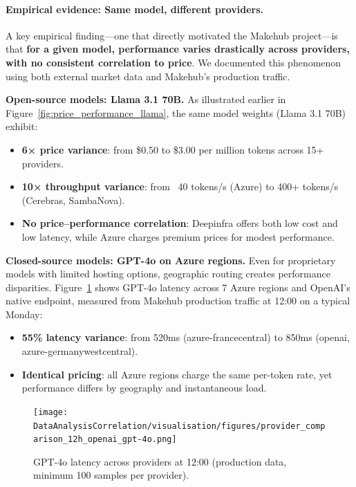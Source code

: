\documentclass[english]{article}
\begin{document}
\paragraph{Empirical evidence: Same model, different providers.}

A key empirical finding—one that directly motivated the Makehub project—is that \textbf{for a given model, performance varies drastically across providers, with no consistent correlation to price}. We documented this phenomenon using both external market data and Makehub's production traffic.

\textbf{Open-source models: Llama 3.1 70B.} As illustrated earlier in Figure~\ref{fig:price_performance_llama}, the same model weights (Llama 3.1 70B) exhibit:
\begin{itemize}
    \item \textbf{6× price variance}: from \$0.50 to \$3.00 per million tokens across 15+ providers.
    \item \textbf{10× throughput variance}: from ~40 tokens/s (Azure) to 400+ tokens/s (Cerebras, SambaNova).
    \item \textbf{No price–performance correlation}: Deepinfra offers both low cost and low latency, while Azure charges premium prices for modest performance.
\end{itemize}

\textbf{Closed-source models: GPT-4o on Azure regions.} Even for proprietary models with limited hosting options, geographic routing creates performance disparities. Figure~\ref{fig:gpt4o_provider_comparison} shows GPT-4o latency across 7 Azure regions and OpenAI's native endpoint, measured from Makehub production traffic at 12:00 on a typical Monday:
\begin{itemize}
    \item \textbf{55\% latency variance}: from 520ms (azure-francecentral) to 850ms (openai, azure-germanywestcentral).
    \item \textbf{Identical pricing}: all Azure regions charge the same per-token rate, yet performance differs by geography and instantaneous load.
\end{itemize}

\begin{figure}[H]
\centering
\texttt{[image: DataAnalysisCorrelation/visualisation/figures/provider\_comparison\_12h\_openai\_gpt-4o.png]}
\caption{GPT-4o latency across providers at 12:00 (production data, minimum 100 samples per provider).}
\label{fig:gpt4o_provider_comparison}
\end{figure}
\end{document}
